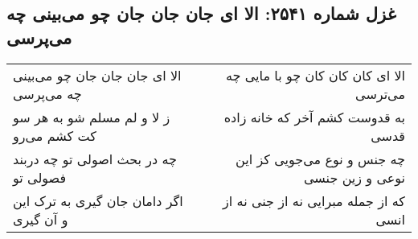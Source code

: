 \begin{center}
\section*{غزل شماره ۲۵۴۱: الا ای جان جان جان چو می‌بینی چه می‌پرسی}
\label{sec:2541}
\begin{longtable}{l p{0.5cm} r}
الا ای جان جان جان چو می‌بینی چه می‌پرسی
&&
الا ای کان کان کان چو با مایی چه می‌ترسی
\\
ز لا و لم مسلم شو به هر سو کت کشم می‌رو
&&
به قدوست کشم آخر که خانه زاده قدسی
\\
چه در بحث اصولی تو چه دربند فصولی تو
&&
چه جنس و نوع می‌جویی کز این نوعی و زین جنسی
\\
اگر دامان جان گیری به ترک این و آن گیری
&&
که از جمله مبرایی نه از جنی نه از انسی
\\
\end{longtable}
\end{center}
